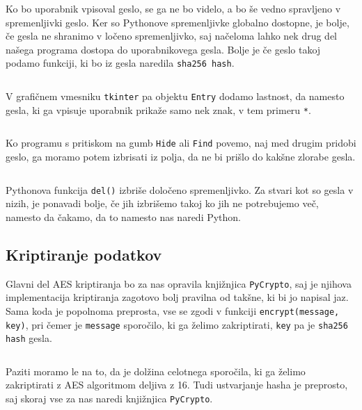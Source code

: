     \inputminted[firstline=4, lastline=5, frame=lines]{python}{latex/code_parts.py}

    Ko bo uporabnik vpisoval geslo, se ga ne bo videlo, a bo še vedno spravljeno v spremenljivki geslo. Ker so Pythonove spremenljivke globalno dostopne, je bolje, če gesla ne shranimo v ločeno spremenljivko, saj načeloma lahko nek drug del našega programa dostopa do uporabnikovega gesla. Bolje je če geslo takoj podamo funkciji, ki bo iz gesla naredila \texttt{sha256 hash}.

    \inputminted[firstline=7, lastline=7, frame=lines]{python}{latex/code_parts.py}

    V grafičnem vmesniku \texttt{tkinter} pa objektu \texttt{Entry} dodamo lastnost, da namesto gesla, ki ga vpisuje uporabnik prikaže samo nek znak, v tem primeru \texttt{*}.

    \inputminted[firstline=9, lastline=10, frame=lines]{python}{latex/code_parts.py}

    Ko programu s pritiskom na gumb \texttt{Hide} ali \texttt{Find} povemo, naj med drugim pridobi geslo, ga moramo potem izbrisati iz polja, da ne bi prišlo do kakšne zlorabe gesla.

    \inputminted[firstline=12, lastline=15, frame=lines]{python}{latex/code_parts.py}

    Pythonova funkcija \texttt{del()} izbriše določeno spremenljivko. Za stvari kot so gesla v nizih, je ponavadi bolje, če jih izbrišemo takoj ko jih ne potrebujemo več, namesto da čakamo, da to namesto nas naredi Python.


\subsection{Kriptiranje podatkov}

    Glavni del AES kriptiranja bo za nas opravila knjižnjica \texttt{PyCrypto}, saj je njihova implementacija kriptiranja zagotovo bolj pravilna od takšne, ki bi jo napisal jaz. Sama koda je popolnoma preprosta, vse se zgodi v funkciji \texttt{encrypt(message, key)}, pri čemer je \texttt{message} sporočilo, ki ga želimo zakriptirati, \texttt{key} pa je \texttt{sha256 hash} gesla.

    \inputminted[firstline=17, lastline=19, frame=lines]{python}{latex/code_parts.py}

    Paziti moramo le na to, da je dolžina celotnega sporočila, ki ga želimo zakriptirati z AES algoritmom deljiva z 16. Tudi ustvarjanje hasha je preprosto, saj skoraj vse za nas naredi knjižnjica \texttt{PyCrypto}.

